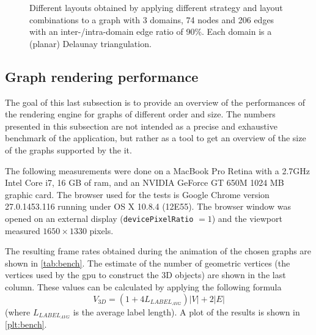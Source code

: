 {\begin{landscape}
\begin{figure}
{    }\hfill
    \caption[Different layouts for a graph with 3 domains, 74 nodes and 206 edges with a inter-/intra-domain edge ratio of 90\%.]{Different layouts obtained by applying different strategy and layout combinations to a graph with 3 domains, 74 nodes and 206 edges with an inter-/intra-domain edge ratio of 90\%. Each domain is a (planar) Delaunay triangulation.}%
    \label{fig:ex5}
    \clearpage
  \end{figure}
  \end{landscape}
    \cleartoodd
}


\subsection{Graph rendering performance}

The goal of this last subsection is to provide an overview of the performances of the rendering engine for graphs of different order and size. The numbers presented in this subsection are not intended as a precise and exhaustive benchmark of the application, but rather as a tool to get an overview of the size of the graphs supported by the it.

The following measurements were done on a MacBook Pro Retina with a 2.7GHz Intel Core i7, 16 GB of \gls{ram}, and an NVIDIA GeForce GT 650M 1024 MB graphic card. The browser used for the tests is Google Chrome version 27.0.1453.116 running under OS X 10.8.4 (12E55). The browser window was opened on an external display (\texttt{devicePixelRatio} $= 1$) and the viewport measured $1650\times1330$ pixels.

The resulting frame rates obtained during the animation of the chosen graphs are shown in \vref{tab:bench}. The estimate of the number of geometric vertices (the vertices used by the \gls{gpu} to construct the 3D objects) are shown in the last column. These values can be calculated by applying the following formula
\[
  V_{3D} = (1 + 4 L_{\mathit{LABEL}_\mathit{AVG}}) |V| + 2 |E|
\]
(where $L_{\mathit{LABEL}_\mathit{AVG}}$ is the average label length). A plot of the results is shown in \vref{plt:bench}.


